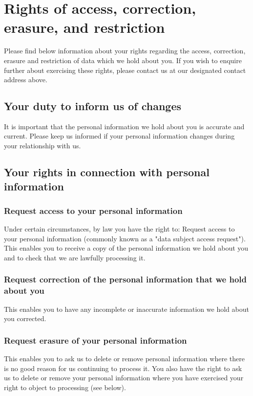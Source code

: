 \documentclass[12pt]{article}
\begin{document}
\section{Rights of access, correction, erasure, and restriction}

Please find below information about your rights regarding the access, correction, erasure and restriction of data which we hold about you. If you wish to enquire further about exercising these rights, please contact us at our designated contact address above.

\subsection*{Your duty to inform us of changes}
It is important that the personal information we hold about you is accurate and current. Please keep us informed if your personal information changes during your relationship with us. 

\subsection*{Your rights in connection with personal information}

\subsubsection*{Request access to your personal information}
Under certain circumstances, by law you have the right to:
Request access to your personal information (commonly known as a "data subject access request"). This enables you to receive a copy of the personal information we hold about you and to check that we are lawfully processing it.

\subsubsection*{Request correction of the personal information that we hold about you} This enables you to have any incomplete or inaccurate information we hold about you corrected.

\subsubsection*{Request erasure of your personal information}

This enables you to ask us to delete or remove personal information where there is no good reason for us continuing to process it. You also have the right to ask us to delete or remove your personal information where you have exercised your right to object to processing (see below).
\end{document}
